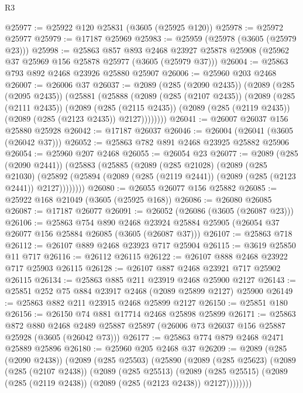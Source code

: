 \begin{lexlean}{R3}
\begin{coremodule}
@25977 := @25922 @120 @25831 (@3605 (@25925 @120))
@25978 := @25972 @25977
@25979 := @17187 @25969
@25983 := @25959 (@25978 (@3605 (@25979 @23)))
@25998 := @25863
    @857
    @893
    @2468
    @23927
    @25878
    @25908
    (@25962 @37 @25969 @156 @25878 @25977 (@3605 (@25979 @37)))
@26004 := @25863 @793 @892 @2468 @23926 @25880 @25907
@26006 := @25960 @203 @2468
@26007 := @26006 @37
@26037 := @2089
    (@285 (@2090 @2435))
    (@2089
      (@285 (@2095 @2435))
      (@25881
        (@25888
          (@2089
            (@285 (@2107 @2435))
            (@2089
              (@285 (@2111 @2435))
              (@2089
                (@285 (@2115 @2435))
                (@2089 (@285 (@2119 @2435)) (@2089 (@285 (@2123 @2435)) @2127))))))))
@26041 := @26007 @26037 @156 @25880 @25928
@26042 := @17187 @26037
@26046 := @26004 (@26041 (@3605 (@26042 @37)))
@26052 := @25863 @782 @891 @2468 @23925 @25882 @25906
@26054 := @25960 @207 @2468
@26055 := @26054 @23
@26077 := @2089
    (@285 (@2090 @2441))
    (@25883
      (@25885
        (@2089
          (@285 @21028)
          (@2089
            (@285 @21030)
            (@25892 (@25894 (@2089 (@285 (@2119 @2441)) (@2089 (@285 (@2123 @2441)) @2127))))))))
@26080 := @26055 @26077 @156 @25882
@26085 := @25922 @168 @21049 (@3605 (@25925 @168))
@26086 := @26080 @26085
@26087 := @17187 @26077
@26091 := @26052 (@26086 (@3605 (@26087 @23)))
@26106 := @25863
    @754
    @890
    @2468
    @23924
    @25884
    @25905
    (@26054 @37 @26077 @156 @25884 @26085 (@3605 (@26087 @37)))
@26107 := @25863 @718
@26112 := @26107 @889 @2468 @23923 @717 @25904
@26115 := @3619 @25850 @11 @717
@26116 := @26112 @26115
@26122 := @26107 @888 @2468 @23922 @717 @25903 @26115
@26128 := @26107 @887 @2468 @23921 @717 @25902 @26115
@26134 := @25863 @885 @211 @23919 @2468 @25900 @2127
@26143 := @25851 @252 @75 @884 @23917 @2468 (@2089 @25899 @2127) @25900
@26149 := @25863 @882 @211 @23915 @2468 @25899 @2127
@26150 := @25851 @180
@26156 := @26150 @74 @881 @17714 @2468 @25898 @25899
@26171 := @25863
    @872
    @880
    @2468
    @2489
    @25887
    @25897
    (@26006 @73 @26037 @156 @25887 @25928 (@3605 (@26042 @73)))
@26177 := @25863 @774 @879 @2468 @2471 @25889 @25896
@26180 := @25960 @205 @2468 @37
@26209 := @2089
    (@285 (@2090 @2438))
    (@2089
      (@285 @25503)
      (@25890
        (@2089
          (@285 @25623)
          (@2089
            (@285 (@2107 @2438))
            (@2089
              (@285 @25513)
              (@2089
                (@285 @25515)
                (@2089 (@285 (@2119 @2438)) (@2089 (@285 (@2123 @2438)) @2127))))))))

\end{coremodule}
\end{lexlean}
